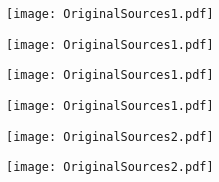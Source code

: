 \documentclass[main.tex]{subfiles}
\begin{document}
\setcounter{secnumdepth}{0}


{\parindent0pt\texttt{[image: OriginalSources1.pdf]}}\newpage

{\parindent0pt\texttt{[image: OriginalSources1.pdf]}}\newpage

{\parindent0pt\texttt{[image: OriginalSources1.pdf]}}\newpage

{\parindent0pt\texttt{[image: OriginalSources1.pdf]}}



{\parindent0pt\texttt{[image: OriginalSources2.pdf]}}\newpage

{\parindent0pt\texttt{[image: OriginalSources2.pdf]}}\newpage
\end{document}
